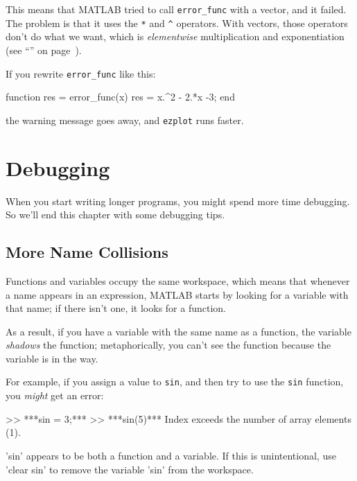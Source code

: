 This means that MATLAB tried to call \lstinline{error_func} with a vector, and it failed. 
The problem is that it uses the \lstinline{*} and \lstinline{^} operators.  With vectors, those operators don't do what we want, which is {\em elementwise} multiplication and exponentiation
(see ``'' on page~\pageref{elementwise}).


If you rewrite \lstinline{error_func} like this:

\begin{code}
function res = error_func(x)
    res = x.^2 - 2.*x -3;
end
\end{code}
the warning message goes away, and \lstinline{ezplot} runs faster.


\section{Debugging}

When you start writing longer programs, you might spend more time debugging.  So we'll end this chapter with some debugging tips.

\subsection{More Name Collisions}

Functions and variables occupy the same workspace, which means
that whenever a name appears in an expression, MATLAB starts by looking
for a variable with that name; if there isn't one, it looks for
a function.


As a result, if you have a variable with the same name as a function,
the variable {\em shadows} the function; metaphorically, you can't see the function because the variable is in the way.  

For example, if you assign
a value to \lstinline{sin}, and then try to use the \lstinline{sin} function, you
{\em might} get an error:

\begin{code}
>> ***sin = 3;***
>> ***sin(5)***
Index exceeds the number of array elements (1).

'sin' appears to be both a function and a variable.
If this is unintentional, use 'clear sin' to remove 
the variable 'sin' from the workspace.
\end{code}

